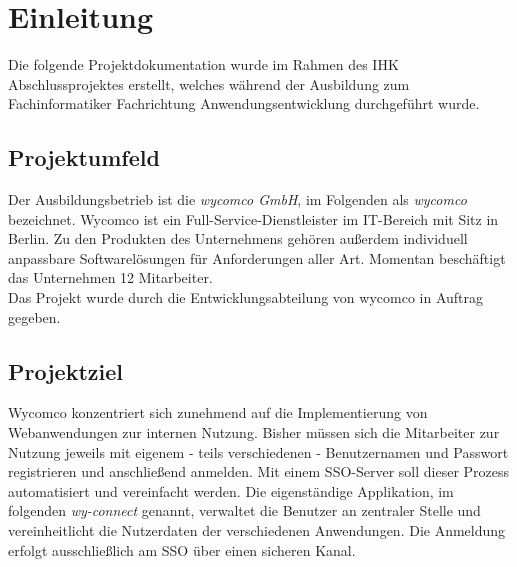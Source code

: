 \section{Einleitung}
\label{sec:Einleitung}
Die folgende Projektdokumentation wurde im Rahmen des IHK Abschlussprojektes erstellt, welches während der Ausbildung zum Fachinformatiker Fachrichtung Anwendungsentwicklung durchgeführt wurde.
\subsection{Projektumfeld} 
\label{sec:Projektumfeld}
Der Ausbildungsbetrieb ist die \textit{wycomco GmbH}, im Folgenden als \textit{wycomco} bezeichnet. Wycomco ist ein Full-Service-Dienstleister im IT-Bereich mit Sitz in Berlin. Zu den Produkten des Unternehmens gehören außerdem individuell anpassbare Softwarelösungen für Anforderungen aller Art. Momentan beschäftigt das Unternehmen 12 Mitarbeiter. \\
Das Projekt wurde durch die Entwicklungsabteilung von wycomco in Auftrag gegeben. 
\subsection{Projektziel} 
\label{sec:Projektziel}
Wycomco konzentriert sich zunehmend auf die Implementierung von Webanwendungen zur internen Nutzung. Bisher müssen sich die Mitarbeiter zur Nutzung jeweils  mit eigenem - teils verschiedenen - Benutzernamen und Passwort registrieren und anschließend anmelden.
Mit einem \ac{SSO}-Server soll dieser Prozess automatisiert und vereinfacht werden. Die eigenständige Applikation, im folgenden \textit{wy-connect} genannt, verwaltet die Benutzer an zentraler Stelle und vereinheitlicht die Nutzerdaten der verschiedenen Anwendungen. Die Anmeldung erfolgt ausschließlich am \ac{SSO} über einen sicheren Kanal. 

